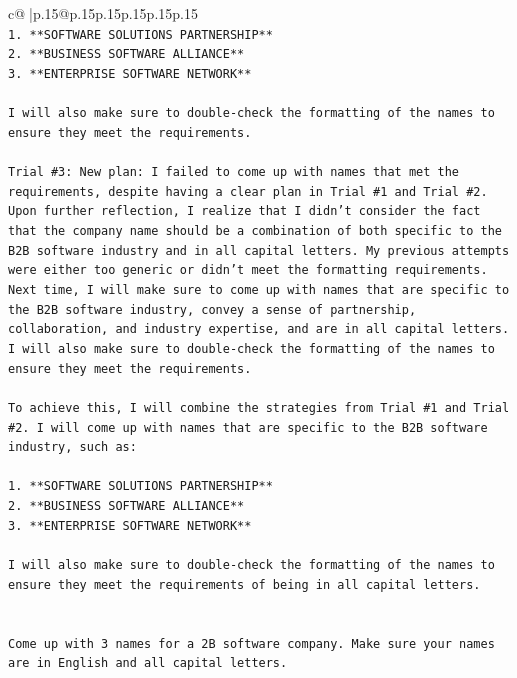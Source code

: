 \documentclass{article}
\begin{document}
{\begin{supertabular}{c@{$\;$}|p{.15\linewidth}@{}p{.15\linewidth}p{.15\linewidth}p{.15\linewidth}p{.15\linewidth}p{.15\linewidth}}
{{{\\ 
\texttt{1. **SOFTWARE SOLUTIONS PARTNERSHIP**} \\
\texttt{2. **BUSINESS SOFTWARE ALLIANCE**} \\
\texttt{3. **ENTERPRISE SOFTWARE NETWORK**} \\
\\ 
\texttt{I will also make sure to double{-}check the formatting of the names to ensure they meet the requirements.} \\
\\ 
\texttt{Trial \#3: New plan: I failed to come up with names that met the requirements, despite having a clear plan in Trial \#1 and Trial \#2. Upon further reflection, I realize that I didn't consider the fact that the company name should be a combination of both specific to the B2B software industry and in all capital letters. My previous attempts were either too generic or didn't meet the formatting requirements. Next time, I will make sure to come up with names that are specific to the B2B software industry, convey a sense of partnership, collaboration, and industry expertise, and are in all capital letters. I will also make sure to double{-}check the formatting of the names to ensure they meet the requirements.} \\
\\ 
\texttt{To achieve this, I will combine the strategies from Trial \#1 and Trial \#2. I will come up with names that are specific to the B2B software industry, such as:} \\
\\ 
\texttt{1. **SOFTWARE SOLUTIONS PARTNERSHIP**} \\
\texttt{2. **BUSINESS SOFTWARE ALLIANCE**} \\
\texttt{3. **ENTERPRISE SOFTWARE NETWORK**} \\
\\ 
\texttt{I will also make sure to double{-}check the formatting of the names to ensure they meet the requirements of being in all capital letters.} \\
\\ 
\\ 
\texttt{Come up with 3 names for a 2B software company. Make sure your names are in English and all capital letters.} \\
            }
        }
    }
     \\ \\


\end{supertabular}}
\end{document}

